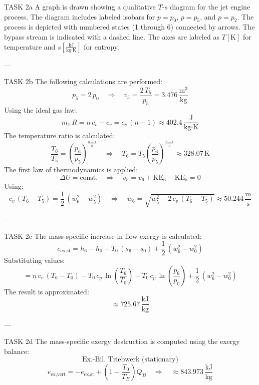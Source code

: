 TASK 2a  
A graph is drawn showing a qualitative \( T \)-\( s \) diagram for the jet engine process. The diagram includes labeled isobars for \( p = p_0 \), \( p = p_5 \), and \( p = p_2 \). The process is depicted with numbered states (1 through 6) connected by arrows. The bypass stream is indicated with a dashed line. The axes are labeled as \( T[\text{K}] \) for temperature and \( s[\frac{\text{kJ}}{\text{kg·K}}] \) for entropy.

---

TASK 2b  
The following calculations are performed:  
\[
p_5 = 2 \, p_0 \quad \Rightarrow \quad v_5 = \frac{2 \, T_5}{p_5} = 3.476 \, \frac{\text{m}^3}{\text{kg}}
\]  
Using the ideal gas law:  
\[
m_{1} \, R = n \, c_v - c_v = c_v \, (n-1) \approx 402.4 \, \frac{\text{J}}{\text{kg·K}}
\]  
The temperature ratio is calculated:  
\[
\frac{T_6}{T_5} = \left( \frac{p_6}{p_5} \right)^{\frac{n-1}{n}} \quad \Rightarrow \quad T_6 = T_5 \left( \frac{p_6}{p_5} \right)^{\frac{n-1}{n}} \approx 328.07 \, \text{K}
\]  
The first law of thermodynamics is applied:  
\[
\Delta U = \text{const.} \quad \Rightarrow \quad v_5 = v_6 + \text{KE}_6 - \text{KE}_5 = 0
\]  
Using:  
\[
c_v \, (T_6 - T_5) = \frac{1}{2} \, (w_6^2 - w_5^2) \quad \Rightarrow \quad w_6 = \sqrt{w_5^2 - 2 \, c_v \, (T_6 - T_5)} \approx 50.244 \, \frac{\text{m}}{\text{s}}
\]

---

TASK 2c  
The mass-specific increase in flow exergy is calculated:  
\[
e_{\text{ex,st}} = h_6 - h_0 - T_0 \, (s_6 - s_0) + \frac{1}{2} \, (w_6^2 - w_0^2)
\]  
Substituting values:  
\[
= n \, c_v \, (T_6 - T_0) - T_0 \, c_p \, \ln \left( \frac{T_6}{T_0} \right) - T_0 \, c_p \, \ln \left( \frac{p_6}{p_0} \right) + \frac{1}{2} \, (w_6^2 - w_0^2)
\]  
The result is approximated:  
\[
\approx 725.67 \, \frac{\text{kJ}}{\text{kg}}
\]

---

TASK 2d  
The mass-specific exergy destruction is computed using the exergy balance:  
\[
\text{Ex.-Bil. Triebwerk (stationary)}  
\]  
\[
e_{\text{ex,vert}} = -e_{\text{ex,st}} + \left( 1 - \frac{T_0}{T_B} \right) \dot{Q}_B \quad \Rightarrow \quad \approx 843.973 \, \frac{\text{kJ}}{\text{kg}}
\]